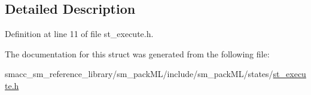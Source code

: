 \subsection{Detailed Description}


Definition at line 11 of file st\+\_\+execute.\+h.



The documentation for this struct was generated from the following file\+:\begin{DoxyCompactItemize}
\item 
smacc\+\_\+sm\+\_\+reference\+\_\+library/sm\+\_\+pack\+M\+L/include/sm\+\_\+pack\+M\+L/states/\hyperlink{sm__packML_2include_2sm__packML_2states_2st__execute_8h}{st\+\_\+execute.\+h}\end{DoxyCompactItemize}
